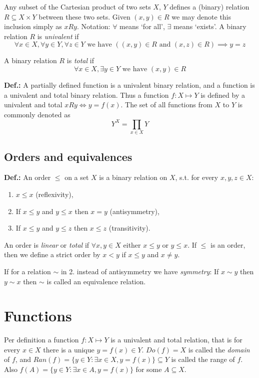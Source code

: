 \documentclass{article}
\begin{document}
Any subset of the Cartesian product of two sets $X$, $Y$ defines a (binary) relation $R \subseteq X \times Y $ between these two sets. Given $(x, y) \in R$ we may denote this inclusion simply as $xRy$. 
   Notation: $\forall$ means ‘for all’, $\exists$ means ‘exists’.
A binary relation $R$ is \textit{univalent} if
\[
\forall x \in X, \forall y \in Y, \forall z \in Y \text{ we have } ((x, y) \in R \text{ and } (x, z)\in R) \implies y = z
\]

A binary relation $R$ is \textit{total} if
\[
\forall x \in X, \exists y \in Y \text{ we have } (x,y) \in R
\]

\textbf{Def.:} A partially defined function is a univalent binary relation, and a function is a univalent and total binary relation. Thus a function $f: X \mapsto Y$ is defined by a univalent and total $xRy\iff y = f(x)$.
The set of all functions from $X$ to $Y$ is commonly denoted as 
\[
Y^X = \prod_{x\in X}Y
\]

\subsection{Orders and equivalences}

\textbf{Def.:} An order $\leq$ on a set $X$ is a binary relation on $X$, s.t. for every $x, y, z \in X$:
\begin{enumerate}
    \item $x \leq x$ (reflexivity),
    \item If $x \leq y$ and $y \leq x$ then $x=y$ (antisymmetry),
    \item If $x \leq y$ and $y\leq z$ then $x\leq z$ (transitivity).
\end{enumerate}


An order is \textit{linear} or \textit{total} if $\forall x,y\in X$ either $x\leq y$ or $y\leq x$. If $\leq$ is an order, then we define a strict order by $x < y$ if $x\leq y$ and $x\neq y$.

If for a relation $\sim$ in 2. instead of antisymmetry we have \textit{symmetry}: 
If $x\sim y$ then $y\sim x$
then $\sim$ is called an equivalence relation.

\section{Functions}

Per definition a function $f: X\mapsto Y$ is a univalent and total relation, that is for every $x\in X$ there is a unique $y = f(x)\in Y$. $Do(f) = X$ is called the \textit{domain} of $f$, and $Ran(f) = \{y \in Y: \exists x \in X, y = f(x)\}\subseteq Y$ is called the range of $f$. Also $f(A) = \{y\in Y:\exists x\in A, y = f(x)\}$ for some $A\subseteq X$.
\end{document}
